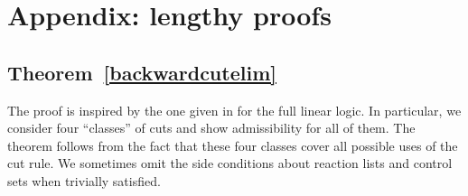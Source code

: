\section{Appendix: lengthy proofs}

\subsection{Theorem~\ref{backwardcutelim}}

The proof is inspired by the one given in \cite{chaudhuri-thesis} for the full
linear logic. In particular, we consider four ``classes'' of cuts and show
admissibility for all of them. The theorem follows from the fact that these four
classes cover all possible uses of the cut rule.  We sometimes omit the side
conditions about reaction lists and control sets when trivially satisfied.

